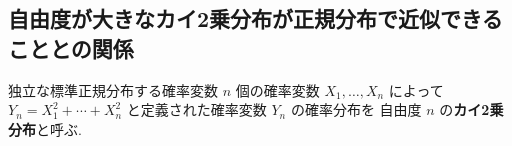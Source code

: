 \documentclass[12pt,twoside]{jarticle}
\theoremstyle{jplain}
\theoremstyle{jplain}
\theoremstyle{jplain}
\numberwithin{theorem}{section}
\numberwithin{equation}{section}
\numberwithin{figure}{section}
\numberwithin{table}{section}
\begin{document}
%
%
%


\subsection{自由度が大きなカイ2乗分布が正規分布で近似できることとの関係}

独立な標準正規分布する確率変数 $n$ 個の確率変数 $X_1,\ldots,X_n$
によって $Y_n=X_1^2+\cdots+X_n^2$ と定義された確率変数 $Y_n$ の確率分布を
自由度 $n$ の{\bf カイ2乗分布}と呼ぶ.
\end{document}
